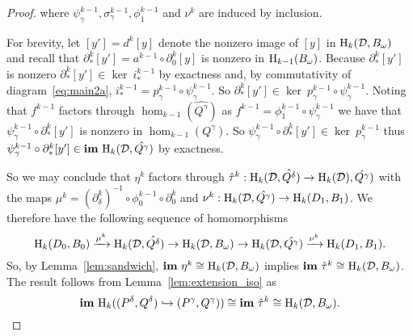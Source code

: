 \begin{proof}
  \noindent where $\psi_\gamma^{k-1}, \sigma_\gamma^{k-1}, \phi_1^{k-1}$ and $\nu^k$ are induced by inclusion.

  For brevity, let $[y'] = d^k[y]$ denote the nonzero image of $[y]$ in $\mathrm{H}_k({\mathcal{D}}, B_{\omega})$ and recall that $\partial_*^k[y'] = a^{k-1}\circ\partial_0^k[y]$ is nonzero in $\mathrm{H}_{k-1}(B_{\omega})$.
  Because $\partial_*^k[y']$ is nonzero $\partial_*^k[y']\in\ker~i_*^{k-1}$ by exactness and, by commutativity of diagram~\ref{eq:main2a}, $i_*^{k-1} = p_\gamma^{k-1}\circ\psi_\gamma^{k-1}$.
  So $\partial_*^k[y']\in \ker~p_\gamma^{k-1}\circ\psi_\gamma^{k-1}$.
  Noting that $f^{k-1}$ factors through $\hom_{k-1}(\hat{Q^\gamma})$ as $f^{k-1} = \phi_1^{k-1}\circ\psi_\gamma^{k-1}$ we have that $\psi_\gamma^{k-1}\circ\partial_*^k[y']$ is nonzero in $\hom_{k-1}(Q^\gamma)$.
  So $\psi_\gamma^{k-1}\circ\partial_*^k[y']\in\ker~p_\gamma^{k-1}$ thus $\psi_\gamma^{k-1}\circ\partial_*^k[y'] \in\mathbf{im}~\mathrm{H}_k({\mathcal{D}}, \hat{Q^\gamma})$ by exactness.

  So we may conclude that $\eta^k$ factors through $\hat{\tau}^k : \mathrm{H}_k({\mathcal{D}}, \hat{Q^\delta})\to \mathrm{H}_k({\mathcal{D}}), \hat{Q^\gamma})$ with the maps $\mu^k = (\partial^k_\delta)^{-1}\circ \phi_0^{k-1}\circ\partial_0^k$ and $\nu^k : \mathrm{H}_k({\mathcal{D}}, \hat{Q^\gamma}) \to \mathrm{H}_k(D_1, B_1)$.
  We therefore have the following sequence of homomorphisms
  \[ \mathrm{H}_k(D_0, B_0)\xrightarrow{\mu^k} \mathrm{H}_k({\mathcal{D}}, \hat{Q^\delta})\to\mathrm{H}_k({\mathcal{D}}, B_{\omega})\to\mathrm{H}_k({\mathcal{D}}, \hat{Q^\gamma})\xrightarrow{\nu^k} \mathrm{H}_k(D_1, B_1).\]
  So, by Lemma~\ref{lem:sandwich}, $\mathbf{im}~\eta^k\cong \mathrm{H}_k({\mathcal{D}}, B_{\omega})$ implies $\mathbf{im}~\hat{\tau}^k\cong \mathrm{H}_k({\mathcal{D}}, B_{\omega})$.
  The result follows from Lemma~\ref{lem:extension_iso} as
  \[ \mathbf{im}~\mathrm{H}_k((P^\delta, Q^\delta)\hookrightarrow (P^\gamma, Q^\gamma))\cong\mathbf{im}~\hat{\tau}^k\cong \mathrm{H}_k({\mathcal{D}}, B_{\omega}).\]
\end{proof}
